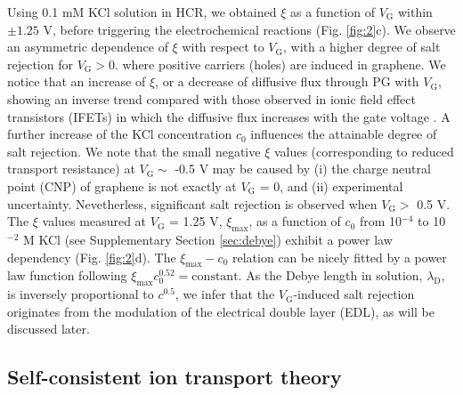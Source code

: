 \documentclass[journal=langd5,email=true, hyperref=true, keywords=false]{achemso}
\begin{document}
Using 0.1 mM KCl solution in HCR, we obtained $\xi$ as a function of
$V_{\mathrm{G}}$ within $\pm1.25$ V, before triggering the
electrochemical reactions (Fig. \ref{fig:2}c). We observe an
asymmetric dependence of $\xi$ with respect to $V_{\mathrm{G}}$, with
a higher degree of salt rejection for $V_{\mathrm{G}}>0$. where
positive carriers (holes) are induced in graphene. We notice that an
increase of $\xi$, or a decrease of diffusive flux through PG with
$V_{\mathrm{G}}$, showing an inverse trend compared with those
observed in ionic field effect transistors (IFETs) in which the
diffusive flux increases with the gate voltage
\cite{Nam_2009,Cheng_2018}. A further increase of the KCl
concentration $c_{0}$ influences the attainable degree of salt
rejection. 
{
We note that the small negative $\xi$ values (corresponding to reduced transport resistance) at $V_{\mathrm{G}} \sim{}$ -0.5 V
may be caused by (i) the charge neutral point (CNP) of graphene is not exactly at $V_{\mathrm{G}}$ = 0, and (ii) experimental uncertainty.
Nevetherless, significant salt rejection is observed when $V_{\mathrm{G}}>$ 0.5 V.
}
The $\xi$ values measured at $V_{\mathrm{G}}$ = 1.25 V,
$\xi_{\mathrm{max}}$, as a function of $c_{0}$ from 10$^{-4}$ to
10$^{-2}$ M KCl (see Supplementary Section \ref{sec:debye}) exhibit
a power law dependency (Fig. \ref{fig:2}d). The
$\xi_{\mathrm{max}}-c_{0}$ relation can be nicely fitted by a power
law function following
$\xi_{\mathrm{max}} c_{0}^{0.52} = \mathrm{constant}$. As the Debye
length in solution, $\lambda_{\mathrm{D}}$, is inversely proportional
to $c^{0.5}$, we infer that the $V_{\mathrm{G}}$-induced salt
rejection originates from the modulation of the electrical double
layer (EDL), as will be discussed later.

\subsection*{Self-consistent ion transport theory}
\label{sec:theory}
\end{document}
